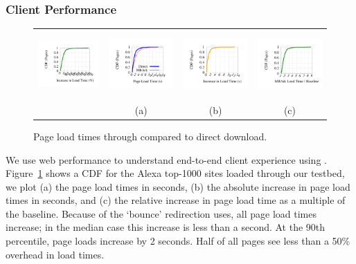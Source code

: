\subsubsection{Client Performance}

\begin{figure}
  \hspace{-15pt}
  \begin{tabular}{cccc}
  \includegraphics[height=1in]{fig/cdflabel}
  &\hspace{-10pt}\includegraphics[height=1in]{fig/e2e_loadtimes}
  &\hspace{-10pt}\includegraphics[height=1in]{fig/e2e_delta_absolute}
  &\hspace{-10pt}\includegraphics[height=1in]{fig/e2e_delta_relative}
  \\
  &(a)&(b)&(c)\\
  \end{tabular}
  \caption[]{\label{fig:e2eloads} Page load times through \sys compared to direct download.}
\end{figure}

We use web performance to understand end-to-end client experience using \sys.
Figure~\ref{fig:e2eloads} shows a CDF for the Alexa top-1000 sites loaded through our testbed, we plot (a) the page load times in seconds, (b) the absolute increase in page load times in seconds, and (c) the relative increase in page load time as a multiple of the baseline. 
Because of the `bounce' redirection \sys uses, all page load times increase; in the median case this increase is less than a second. At the 90th percentile, page loads increase by 2 seconds.
Half of all pages see less than a 50\% overhead in load times.


